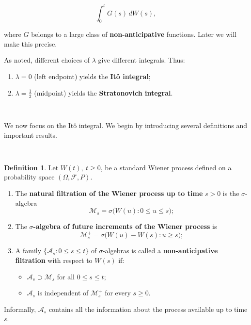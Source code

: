 \documentclass[
  11pt,
  a4paper,
]{book}
\theoremstyle{definition}
\newtheorem{definition}{Definition}[chapter]
\theoremstyle{definition}
\theoremstyle{definition}
\theoremstyle{definition}
\theoremstyle{remark}
\begin{document}
\[
\int_0^t G(s)\,dW(s),
\]

where \(G\) belongs to a large class of \textbf{non-anticipative} functions. Later we will make this precise.

As noted, different choices of \(\lambda\) give different integrals. Thus:

\begin{enumerate}
\def\labelenumi{(\roman{enumi})}
\item
  \(\lambda=0\) (left endpoint) yields the \textbf{Itô integral};
\item
  \(\lambda=\tfrac{1}{2}\) (midpoint) yields the \textbf{Stratonovich integral}.
\end{enumerate}

\(\,\)

We now focus on the Itô integral. We begin by introducing several definitions and important results.

\(\,\)

\begin{definition}

Let \(W(t),\ t\ge 0\), be a standard Wiener process defined on a probability space \((\Omega,\mathcal{F},P)\).

\begin{enumerate}
\def\labelenumi{\arabic{enumi}.}
\item
  The \textbf{natural filtration of the Wiener process up to time} \(s>0\) is the \(\sigma\)-algebra
  \[
  \mathcal{M}_s = \sigma\big(W(u): 0\le u\le s\big);
  \]
\item
  The \textbf{\(\sigma\)-algebra of future increments of the Wiener process} is
  \[
  \mathcal{M}_s^+ = \sigma\big(W(u)-W(s): u\ge s\big);
  \]
\item
  A family \(\{\mathcal{A}_s: 0\le s\le t\}\) of \(\sigma\)-algebras is called a \textbf{non-anticipative filtration} with respect to \(W(s)\) if:

  \begin{itemize}
  \item
    \(\mathcal{A}_s \supset \mathcal{M}_s\) for all \(0\le s\le t\);
  \item
    \(\mathcal{A}_s\) is independent of \(\mathcal{M}_s^+\) for every \(s\ge 0\).
  \end{itemize}
\end{enumerate}

\end{definition}

Informally, \(\mathcal{A}_s\) contains all the information about the process available up to time \(s\).
\end{document}
